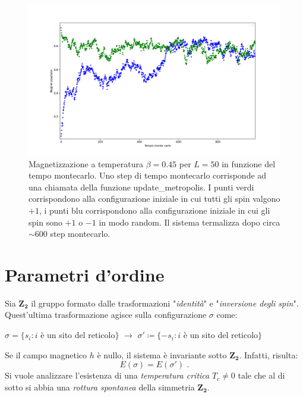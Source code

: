 \documentclass[10pt,a4paper]{article}
\begin{document}
\begin{figure}[h!]
	\centering
	\includegraphics[width=0.90\linewidth]{term045}
	\caption{Magnetizzazione a temperatura $\beta=0.45$ per $L=50$ in funzione del tempo montecarlo. Uno step di tempo montecarlo corrisponde ad una chiamata della funzione update\_metropolis.  I punti verdi corrispondono alla configurazione iniziale in cui tutti gli spin valgono $+1$, i punti blu corrispondono alla configurazione iniziale in cui gli spin sono $+1$ o $-1$ in modo random. Il sistema termalizza dopo circa $\sim 600$ step montecarlo.}
	\label{term045}
\end{figure}



\newpage

\section{Parametri d'ordine}
Sia $\mathbf{Z_2}$ il gruppo formato dalle trasformazioni "\emph{identità}" e "\emph{inversione degli spin}". Quest'ultima trasformazione agisce sulla configurazione $\sigma$ come:\begin{center}
	$\sigma=\{ s_i  : i $ è un sito del reticolo$ \}$ $\longrightarrow$ $\sigma'\coloneqq\{ - s_i  : i $ è un sito del reticolo$ \}$
\end{center} 
Se il campo magnetico $h$ è nullo, il sistema è invariante sotto $\mathbf{Z_2}$. Infatti, risulta: $$E(\sigma)=E(\sigma')\text{ .}$$
Si vuole analizzare l'esistenza di una \emph{temperatura critica} $T_c\ne 0$ tale che al di sotto si abbia una \emph{rottura spontanea} della simmetria $\mathbf{Z_2}$. 
\end{document}
